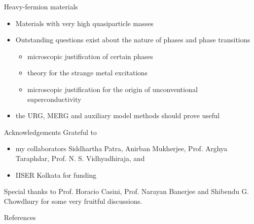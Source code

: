 \documentclass[11pt,aspectratio=169]{beamer}
\begin{document}
\begin{frame}{Heavy-fermion materials}
\begin{itemize}
	\item Materials with very high quasiparticle masses\\[20pt]
	\item Outstanding questions exist about the nature of phases and phase transitions
		\begin{itemize}
			\item microscopic justification of certain phases
			\item theory for the strange metal excitations
			\item microscopic justification for the origin of unconventional superconductivity\\[20pt]
		\end{itemize}
	\item the URG, MERG and auxiliary model methods should prove useful
\end{itemize}
\end{frame}

\begin{frame}{Acknowledgements}
\flushleft
Grateful to\\[10pt]
\begin{itemize}
	\item my collaborators Siddhartha Patra, Anirban Mukherjee, Prof. Arghya Taraphdar, Prof. N. S. Vidhyadhiraja, and \\[10pt]
	\item IISER Kolkata for funding \\[10pt]
\end{itemize}

Special thanks to Prof. Horacio Casini, Prof. Narayan Banerjee and Shibendu G. Chowdhury for some very fruitful discussions.
	
	

	
\end{frame}
	
\begin{frame}[allowframebreaks]{References}
\printbibliography
\end{frame}
\end{document}

